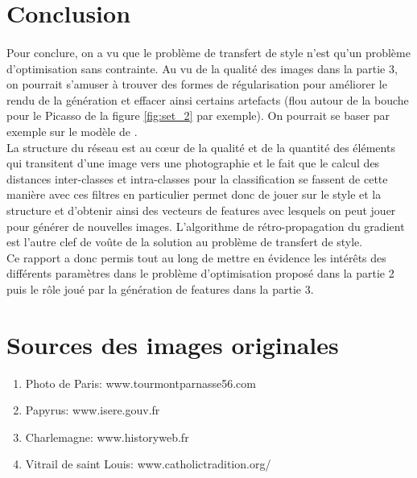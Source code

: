 \documentclass{article}
\begin{document}
\section*{Conclusion}
\paragraph*{}
Pour conclure, on a vu que le problème de transfert de style n'est qu'un problème d'optimisation sans contrainte. Au vu de la qualité des images dans la partie 3, on pourrait s'amuser à trouver des formes de régularisation pour améliorer le rendu de la génération et effacer ainsi certains artefacts (flou autour de la bouche pour le Picasso de la figure \ref{fig:set_2} par exemple). On pourrait se baser par exemple sur le modèle de \cite{DBLP:journals/corr/MahendranV14}.\\
La structure du réseau est au cœur de la qualité et de la quantité des éléments qui transitent d'une image vers une photographie et le fait que le calcul des distances inter-classes et intra-classes pour la classification se fassent de cette manière avec ces filtres en particulier permet donc de jouer sur le style et la structure et d'obtenir ainsi des vecteurs de features avec lesquels on peut jouer pour générer de nouvelles images. L'algorithme de rétro-propagation du gradient est l'autre clef de voûte de la solution au problème de transfert de style.\\
Ce rapport a donc permis tout au long de mettre en évidence les intérêts des différents paramètres dans le problème d'optimisation proposé dans la partie 2 puis le rôle joué par la génération de features dans la partie 3.


\section*{Sources des images originales}
\begin{enumerate}
\item Photo de Paris: www.tourmontparnasse56.com
\item Papyrus: www.isere.gouv.fr
\item Charlemagne: www.historyweb.fr
\item Vitrail de saint Louis: www.catholictradition.org/
\end{enumerate}



\end{document}

